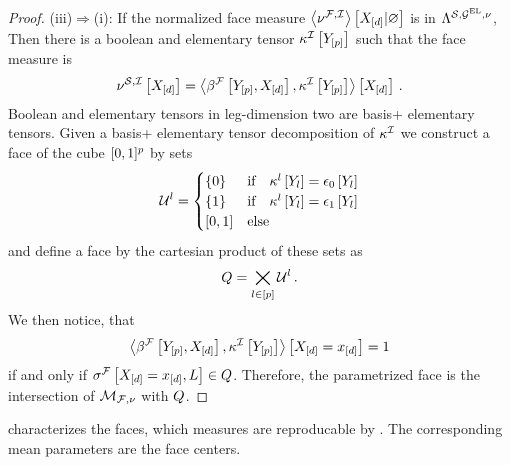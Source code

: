\begin{proof}
    (iii)$\Rightarrow$(i):
    If the normalized face measure $\left\langle \nu^{\mathcal{F},\mathcal{I}}\right\rangle \left[ X_{[d]} | \varnothing \right]$ is in $\Lambda^{\mathcal{S},\mathcal{G}^{\mathrm{EL}},\nu}$,
    Then there is a boolean and elementary tensor $\kappa^{\mathcal{I}}\left[Y_{[p]}\right]$ such that the face measure is
    \begin{align*}
        \nu^{\mathcal{S},\mathcal{I}}\left[X_{[d]}\right]
        = \left\langle \beta^{\mathcal{F}}\left[Y_{[p]},X_{[d]}\right],\kappa^{\mathcal{I}}\left[Y_{[p]}\right]\right\rangle \left[ X_{[d]} \right] \, .
    \end{align*}
    Boolean and elementary tensors in leg-dimension two are basis+ elementary tensors.
    Given a basis+ elementary tensor decomposition of $\kappa^{\mathcal{I}}$ we construct a face of the cube $[0,1]^{p}$ by sets
    \begin{align*}
        \mathcal{U}^{l} = \begin{cases}
                                   \{0\} & \text{if} \quad \kappa^{l}\left[Y_{l}\right] = \epsilon_0\left[Y_{l}\right] \\
                                   \{1\} & \text{if} \quad \kappa^{l}\left[Y_{l}\right] = \epsilon_1\left[Y_{l}\right] \\
                                   [0,1] & \text{else}
        \end{cases}
    \end{align*}
    and define a face by the cartesian product of these sets as
    \begin{align*}
        Q = \bigtimes_{l\in[p]} \mathcal{U}^{l} \, .
    \end{align*}
    We then notice, that
    \begin{align*}
        \left\langle \beta^{\mathcal{F}}\left[Y_{[p]},X_{[d]}\right],\kappa^{\mathcal{I}}\left[Y_{[p]}\right]\right\rangle \left[ X_{[d]}=x_{[d]} \right] = 1
    \end{align*}
    if and only if $\sigma^{\mathcal{F}}\left[X_{[d]}=x_{[d]},L\right]\in Q$.
    Therefore, the parametrized face is the intersection of $\mathcal{M}_{\mathcal{F},\nu}$ with $Q$.
\end{proof}

 characterizes the faces, which measures are reproducable by \HardLogicNetworks{}.
The corresponding mean parameters are the face centers.


